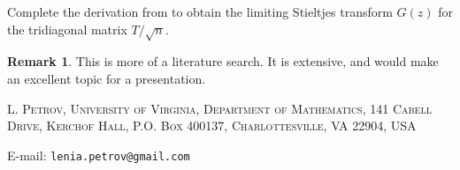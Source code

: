 \documentclass[letterpaper,11pt,oneside,reqno]{article}
\numberwithin{equation}{section}
\theoremstyle{definition}
\newtheorem{remark}[proposition]{Remark}
\begin{document}
Complete the derivation from  to obtain the limiting Stieltjes transform $G(z)$ for the tridiagonal matrix $T/\sqrt{n}$.

\begin{remark}
	This is more of a literature search. It is extensive, and
	would make an excellent topic for a presentation.
\end{remark}





\medskip

\textsc{L. Petrov, University of Virginia, Department of Mathematics, 141 Cabell Drive, Kerchof Hall, P.O. Box 400137, Charlottesville, VA 22904, USA}

E-mail: \texttt{lenia.petrov@gmail.com}
\end{document}
